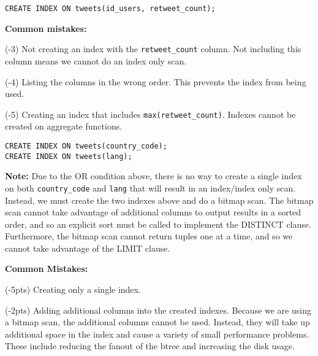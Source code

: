 \documentclass[12pt]{exam}
\theoremstyle{definition}
\begin{document}
\begin{questions}
\begin{solution}
\begin{lstlisting}
CREATE INDEX ON tweets(id_users, retweet_count);
\end{lstlisting}

\textbf{Common mistakes:}

(-3) Not creating an index with the \lstinline{retweet_count} column.  Not including this column means we cannot do an index only scan.

(-4) Listing the columns in the wrong order.  This prevents the index from being used.

(-5) Creating an index that includes \lstinline{max(retweet_count)}.  Indexes cannot be created on aggregate functions.
\end{solution}

\newpage
{}

\begin{solution}
\begin{lstlisting}
CREATE INDEX ON tweets(country_code);
CREATE INDEX ON tweets(lang);
\end{lstlisting}

\textbf{Note:}
Due to the OR condition above, there is no way to create a single index on both \lstinline{country_code} and \lstinline{lang} that will result in an index/index only scan.
Instead, we must create the two indexes above and do a bitmap scan.
The bitmap scan cannot take advantage of additional columns to output results in a sorted order,
and so an explicit sort must be called to implement the DISTINCT clause.
Furthermore, the bitmap scan cannot return tuples one at a time, and so we cannot take advantage of the LIMIT clause.

\textbf{Common Mistakes:}

(-5pts) Creating only a single index.

(-2pts)
    Adding additional columns into the created indexes.
    Because we are using a bitmap scan, the additional columns cannot be used.
    Instead, they will take up additional space in the index and cause a variety of small performance problems.
    These include reducing the fanout of the btree and increasing the disk usage.
\end{solution}


\end{questions}
\end{document}
